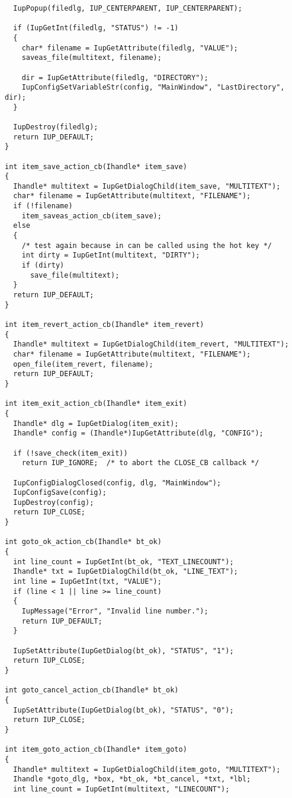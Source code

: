 \documentclass{ctexart}
\begin{document}
\begin{lstlisting}
  IupPopup(filedlg, IUP_CENTERPARENT, IUP_CENTERPARENT);

  if (IupGetInt(filedlg, "STATUS") != -1)
  {
    char* filename = IupGetAttribute(filedlg, "VALUE");
    saveas_file(multitext, filename);

    dir = IupGetAttribute(filedlg, "DIRECTORY");
    IupConfigSetVariableStr(config, "MainWindow", "LastDirectory", dir);
  }

  IupDestroy(filedlg);
  return IUP_DEFAULT;
}

int item_save_action_cb(Ihandle* item_save)
{
  Ihandle* multitext = IupGetDialogChild(item_save, "MULTITEXT");
  char* filename = IupGetAttribute(multitext, "FILENAME");
  if (!filename)
    item_saveas_action_cb(item_save);
  else
  {
    /* test again because in can be called using the hot key */
    int dirty = IupGetInt(multitext, "DIRTY");
    if (dirty)
      save_file(multitext);
  }
  return IUP_DEFAULT;
}

int item_revert_action_cb(Ihandle* item_revert)
{
  Ihandle* multitext = IupGetDialogChild(item_revert, "MULTITEXT");
  char* filename = IupGetAttribute(multitext, "FILENAME");
  open_file(item_revert, filename);
  return IUP_DEFAULT;
}

int item_exit_action_cb(Ihandle* item_exit)
{
  Ihandle* dlg = IupGetDialog(item_exit);
  Ihandle* config = (Ihandle*)IupGetAttribute(dlg, "CONFIG");

  if (!save_check(item_exit))
    return IUP_IGNORE;  /* to abort the CLOSE_CB callback */

  IupConfigDialogClosed(config, dlg, "MainWindow");
  IupConfigSave(config);
  IupDestroy(config);
  return IUP_CLOSE;
}

int goto_ok_action_cb(Ihandle* bt_ok)
{
  int line_count = IupGetInt(bt_ok, "TEXT_LINECOUNT");
  Ihandle* txt = IupGetDialogChild(bt_ok, "LINE_TEXT");
  int line = IupGetInt(txt, "VALUE");
  if (line < 1 || line >= line_count)
  {
    IupMessage("Error", "Invalid line number.");
    return IUP_DEFAULT;
  }

  IupSetAttribute(IupGetDialog(bt_ok), "STATUS", "1");
  return IUP_CLOSE;
}

int goto_cancel_action_cb(Ihandle* bt_ok)
{
  IupSetAttribute(IupGetDialog(bt_ok), "STATUS", "0");
  return IUP_CLOSE;
}

int item_goto_action_cb(Ihandle* item_goto)
{
  Ihandle* multitext = IupGetDialogChild(item_goto, "MULTITEXT");
  Ihandle *goto_dlg, *box, *bt_ok, *bt_cancel, *txt, *lbl;
  int line_count = IupGetInt(multitext, "LINECOUNT");


\end{lstlisting}
\end{document}

